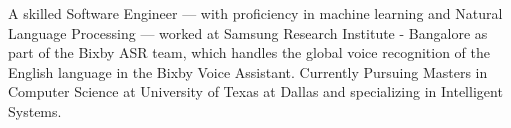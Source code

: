 

\begin{cvparagraph}

A skilled Software Engineer — with proficiency in machine learning and Natural Language Processing — worked
at Samsung Research Institute - Bangalore as part of the Bixby ASR team, which handles the global voice
recognition of the English language in the Bixby Voice Assistant.
Currently Pursuing Masters in Computer Science at University of Texas at Dallas and specializing in Intelligent Systems.
\end{cvparagraph}
